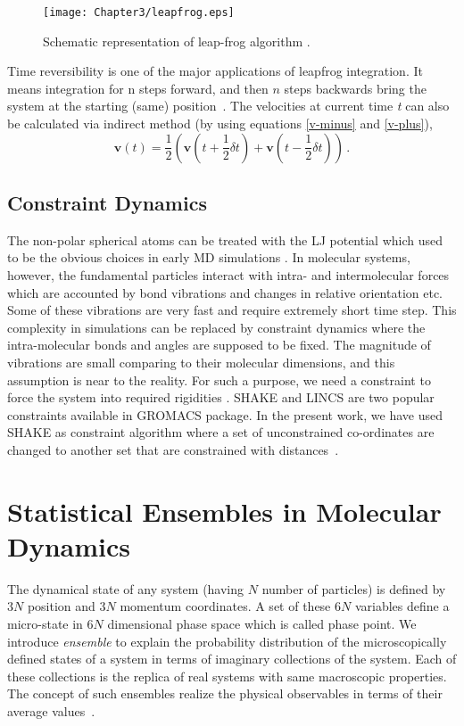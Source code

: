 \begin{figure}[h!]
\centering
\texttt{[image: Chapter3/leapfrog.eps]}
\caption[Schematic representation of leap-frog algorithm. ]{Schematic representation of leap-frog algorithm \citep{Frenkel2002}.}
\label{leap_frog}
\end{figure}
Time reversibility is one of the major applications of leapfrog integration. It means integration for n steps forward, and then $n$ steps backwards bring the system at the starting (same) position~\citep{Allen1989}. 
The velocities at current time {\it t} can also be calculated via indirect method (by using equations \ref{v-minus} and \ref{v-plus}), 
\begin{equation}
\textbf{v}(t) = \frac{1}{2} \left(\textbf{v}\left(t + \frac{1}{2} \delta t\right) + \textbf{v} \left(t - \frac{1}{2} \delta t\right)\right)\,.
\end{equation}
\subsection{Constraint Dynamics}
The non-polar spherical atoms can be treated with the LJ potential which used to be the obvious choices in early 
MD simulations \citep{Harp1968, Harp1970}. In molecular systems, however, the fundamental particles interact with intra- and intermolecular forces which are accounted by bond vibrations and changes in relative orientation etc. Some of these vibrations are very fast and require extremely short time step. This complexity in simulations can be replaced by constraint dynamics where the intra-molecular bonds and angles are supposed to be fixed. The magnitude of vibrations are small comparing to their molecular dimensions, and this assumption is near to the reality. For such a purpose, we need a constraint to force the system into required rigidities \citep{Leach2001}. SHAKE and LINCS are two popular constraints available in GROMACS package.  In the present work, we have used SHAKE as constraint algorithm where a set of unconstrained co-ordinates are changed to another set that are constrained with distances~\citep{Gromacs-manual}.
\section{ Statistical Ensembles in Molecular Dynamics}
The dynamical state of any system (having $N$ number of particles) is defined by $3N$ position and $3N$ momentum coordinates. A set of these $6N$ variables define a micro-state in $6N$ dimensional phase space which is called phase point. We introduce {\it ensemble} to explain the probability distribution of the microscopically defined states of a system in terms of imaginary collections of the system. Each of these collections is the replica of real systems with same macroscopic properties. The concept of such ensembles realize the physical observables in terms of their average values~\citep{pathria1996}.

